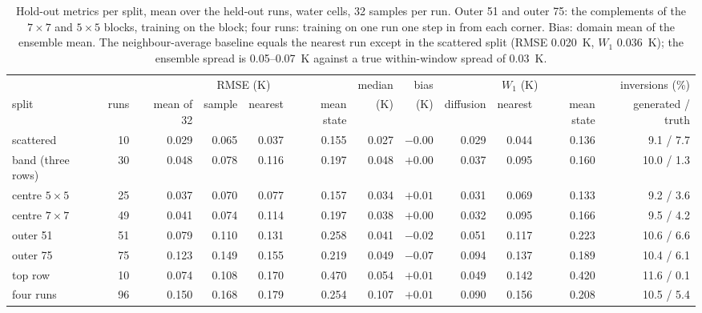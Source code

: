 \documentclass[11pt,a4paper]{article}
\begin{document}
\begin{table}[H]
\centering\scriptsize\setlength{\tabcolsep}{2pt}
\begin{tabular}{lrrrrrrrrrrr}
\toprule
 & & \multicolumn{4}{c}{RMSE (K)} & median & bias & \multicolumn{3}{c}{$W_1$ (K)} & inversions (\%) \\
\cmidrule(lr){3-6}\cmidrule(lr){9-11}
split & runs & mean of 32 & sample & nearest & mean state & (K) & (K) & diffusion & nearest & mean state & generated / truth \\
\midrule
scattered & 10 & 0.029 & 0.065 & 0.037 & 0.155 & 0.027 & $-0.00$ & 0.029 & 0.044 & 0.136 & 9.1 / 7.7 \\
band (three rows) & 30 & 0.048 & 0.078 & 0.116 & 0.197 & 0.048 & $+0.00$ & 0.037 & 0.095 & 0.160 & 10.0 / 1.3 \\
centre $5\times5$ & 25 & 0.037 & 0.070 & 0.077 & 0.157 & 0.034 & $+0.01$ & 0.031 & 0.069 & 0.133 & 9.2 / 3.6 \\
centre $7\times7$ & 49 & 0.041 & 0.074 & 0.114 & 0.197 & 0.038 & $+0.00$ & 0.032 & 0.095 & 0.166 & 9.5 / 4.2 \\
\midrule
outer 51 & 51 & 0.079 & 0.110 & 0.131 & 0.258 & 0.041 & $-0.02$ & 0.051 & 0.117 & 0.223 & 10.6 / 6.6 \\
outer 75 & 75 & 0.123 & 0.149 & 0.155 & 0.219 & 0.049 & $-0.07$ & 0.094 & 0.137 & 0.189 & 10.4 / 6.1 \\
top row & 10 & 0.074 & 0.108 & 0.170 & 0.470 & 0.054 & $+0.01$ & 0.049 & 0.142 & 0.420 & 11.6 / 0.1 \\
\midrule
four runs & 96 & 0.150 & 0.168 & 0.179 & 0.254 & 0.107 & $+0.01$ & 0.090 & 0.156 & 0.208 & 10.5 / 5.4 \\
\bottomrule
\end{tabular}
\caption{Hold-out metrics per split, mean over the held-out runs, water cells, 32 samples per run. Outer 51 and
outer 75: the complements of the $7\times7$ and $5\times5$ blocks, training on the block; four runs: training on one
run one step in from each corner. Bias: domain mean of the ensemble mean. The neighbour-average baseline equals the
nearest run except in the scattered split (RMSE \SI{0.020}{K}, $W_1$ \SI{0.036}{K}); the ensemble spread is
0.05--\SI{0.07}{K} against a true within-window spread of \SI{0.03}{K}.}
\label{tab:main}
\end{table}
\end{document}

